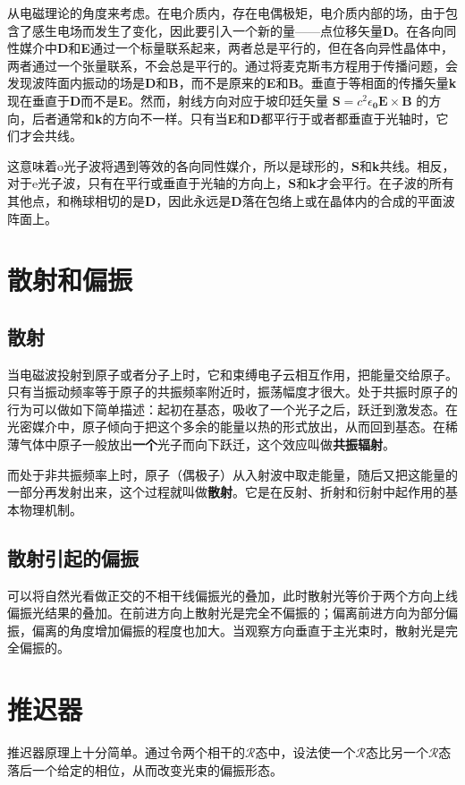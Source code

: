 \documentclass[UTF8]{ctexart}
\newcommand{\backdoc}{\normalsize}
\begin{document}
	从电磁理论的角度来考虑。在电介质内，存在电偶极矩，电介质内部的场，由于包含了感生电场而发生了变化，因此要引入一个新的量——点位移矢量\textbf{D}。在各向同性媒介中\textbf{D}和\textbf{E}通过一个标量联系起来，两者总是平行的，但在各向异性晶体中，两者通过一个张量联系，不会总是平行的。通过将麦克斯韦方程用于传播问题，会发现波阵面内振动的场是\textbf{D}和\textbf{B}，而不是原来的\textbf{E}和\textbf{B}。垂直于等相面的传播矢量\textbf{k}现在垂直于\textbf{D}而不是\textbf{E}。然而，射线方向对应于坡印廷矢量 $\mathbf{S}=c^{2} \epsilon_{\mathbf{0}} \mathbf{E} \times \mathbf{B}$ 的方向，后者通常和\textbf{k}的方向不一样。只有当\textbf{E}和\textbf{D}都平行于或者都垂直于光轴时，它们才会共线。
	
	这意味着o光子波将遇到等效的各向同性媒介，所以是球形的，\textbf{S}和\textbf{k}共线。相反，对于e光子波，只有在平行或垂直于光轴的方向上，\textbf{S}和\textbf{k}才会平行。在子波的所有其他点，和椭球相切的是\textbf{D}，因此永远是\textbf{D}落在包络上或在晶体内的合成的平面波阵面上。
	
	\section{散射和偏振}
	\subsection{散射}
	
	\backdoc
	当电磁波投射到原子或者分子上时，它和束缚电子云相互作用，把能量交给原子。只有当振动频率等于原子的共振频率附近时，振荡幅度才很大。处于共振时原子的行为可以做如下简单描述：起初在基态，吸收了一个光子之后，跃迁到激发态。在光密媒介中，原子倾向于把这个多余的能量以热的形式放出，从而回到基态。在稀薄气体中原子一般放出\textbf{一个}光子而向下跃迁，这个效应叫做\textbf{共振辐射}。
	
	而处于非共振频率上时，原子（偶极子）从入射波中取走能量，随后又把这能量的一部分再发射出来，这个过程就叫做\textbf{散射}。它是在反射、折射和衍射中起作用的基本物理机制。
	
	\subsection{散射引起的偏振}
	
	\backdoc
	可以将自然光看做正交的不相干线偏振光的叠加，此时散射光等价于两个方向上线偏振光结果的叠加。在前进方向上散射光是完全不偏振的；偏离前进方向为部分偏振，偏离的角度增加偏振的程度也加大。当观察方向垂直于主光束时，散射光是完全偏振的。
	
	\section{推迟器}
	推迟器原理上十分简单。通过令两个相干的$ \mathscr{R} $态中，设法使一个$ \mathscr{R} $态比另一个$ \mathscr{R} $态落后一个给定的相位，从而改变光束的偏振形态。
	
\end{document}
